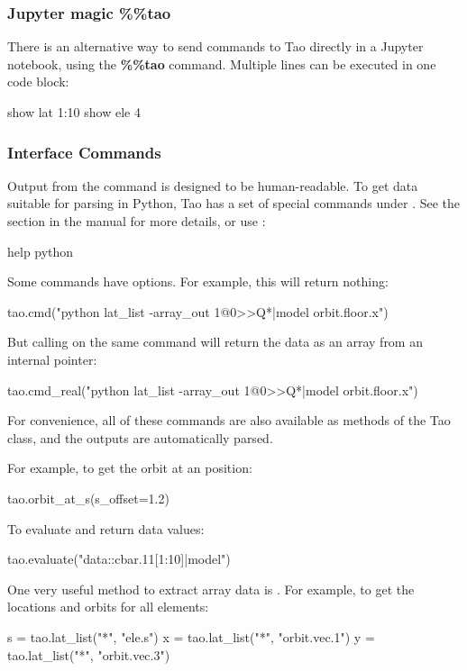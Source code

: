 \documentclass{hitec}     %
\begin{document}
{{{{\subsubsection{Jupyter magic \%\%tao}
There is an alternative way to send commands to Tao directly in a Jupyter notebook, using the \textbf{\%\%tao} command. Multiple lines can be executed in one code block:
\begin{code}
show lat 1:10
show ele 4
\end{code}

\subsubsection{Interface Commands}
Output from the  command is designed to be human-readable. To get data suitable for parsing in Python, Tao has a set of special commands under . See the  section in the \tao manual for more details, or use :
\begin{code}
help python
\end{code}

Some commands have  options. For example, this will return nothing:
\begin{code}
tao.cmd("python lat_list -array_out 1@0>>Q*|model orbit.floor.x")
\end{code}
But calling  on the same command will return the data as an array from an internal pointer:
\begin{code}
tao.cmd_real("python lat_list -array_out 1@0>>Q*|model orbit.floor.x")
\end{code}

For convenience, all of these commands are also available as methods of the Tao class, and the outputs are automatically parsed.

For example, to get the orbit at an  position:
\begin{code}
tao.orbit_at_s(s_offset=1.2)
\end{code}

To evaluate and return data values:
\begin{code}
tao.evaluate("data::cbar.11[1:10]|model")
\end{code}

One very useful method to extract array data is . For example, to get the locations and orbits for all elements:
\begin{code}
s = tao.lat_list("*", "ele.s")
x = tao.lat_list("*", "orbit.vec.1")
y = tao.lat_list("*", "orbit.vec.3")
\end{code}

}}}}
\end{document}
